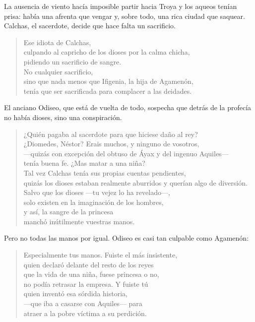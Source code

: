 \documentclass[11pt,a4paper]{article}
\begin{document}
La ausencia de viento hacía imposible partir hacia Troya y los aqueos tenían prisa: había una afrenta que vengar y, sobre todo, una rica ciudad que saquear. Calchas, el sacerdote, decide que hace falta un sacrificio.

\begin{verse}
Ese idiota de Calchas,\\
culpando al capricho de los dioses por la calma chicha,\\
pidiendo un sacrificio de sangre.\\
No cualquier sacrificio,\\
sino que nada menos que Ifigenia, la hija de Agamenón,\\
tenía que ser sacrificada para complacer a las deidades.
\end{verse}

El anciano Odiseo, que está de vuelta de todo, sospecha que detrás de la profecía no había dioses, sino una conspiración.

\begin{verse}
¿Quién pagaba al sacerdote para que hiciese daño al rey?\\
¿Diomedes, Néstor? Erais muchos, y ninguno de vosotros,\\
---quizás con excepción del obtuso de Áyax y del ingenuo Aquiles---\\
tenía buena fe. ¿Mas matar a una niña?\\
Tal vez Calchas tenía sus propias cuentas pendientes,\\
quizás los dioses estaban realmente aburridos y querían algo de diversión.\\
Salvo que los dioses ---tu vejez lo ha revelado---,\\
solo existen en la imaginación de los hombres,\\
y así, la sangre de la princesa\\
manchó inútilmente vuestras manos.
\end{verse}

Pero no todas las manos por igual. Odiseo es casi tan culpable como Agamenón:

\begin{verse}
Especialmente tus manos. Fuiste el más insistente,\\
quien declaró delante del resto de los reyes\\
que la vida de una niña, fuese princesa o no,\\
no podía retrasar la empresa. Y fuiste tú\\
quien inventó esa sórdida historia,\\
---que iba a casarse con Aquiles--- para\\
atraer a la pobre víctima a su perdición.
\end{verse}
\end{document}

